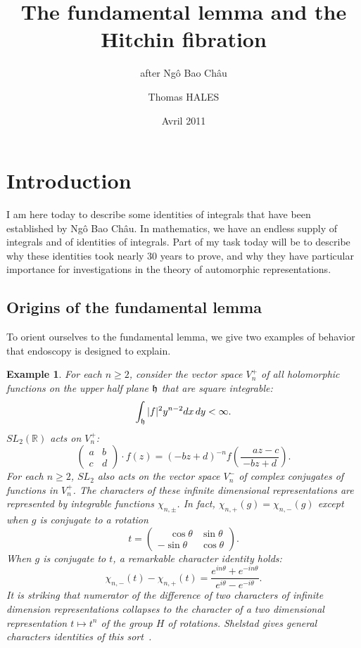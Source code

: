 \documentclass[brochure,english,12pt]{bourbaki}
\date{Avril 2011}
\title{The fundamental lemma and the Hitchin fibration}
\subtitle{after Ng\^o Bao Ch\^au}
\author{Thomas HALES}
\newtheorem{example}[equation]{Example}
\newcommand{\ring}[1]{\mathbb{#1}}
\newcommand{\NBC}{Ng\^o Bao Ch\^au}
\begin{document}
\maketitle

{


}


\section{Introduction}


I am here today to describe some identities of integrals that have
been established by \NBC.  In mathematics, we have an endless supply
of integrals and of identities of integrals.  Part of my task today
will be to describe why these identities took nearly 30 years to
prove, and why they have particular importance for investigations in
the theory of automorphic representations.






\subsection{Origins of the fundamental lemma}


To orient ourselves to the fundamental lemma, we give two examples of
behavior that endoscopy is designed to explain.


\begin{example}  For each $n\ge 2$, consider the vector space $V^+_n$
of all holomorphic functions on the upper half plane ${\frak h}$ that
are square integrable:
\[
\int_{\frak h} |f|^2 y^{n-2} dx\, dy < \infty.
\]
$SL_2(\ring{R})$ acts on $V^+_n$:
\[
\begin{pmatrix} a & b \\ c & d \end{pmatrix} \cdot f(z) = 
(-b z + d ) ^{-n} f (\frac{\phantom{-}a z - c}{-b z + d}).
\]
For each $n\ge 2$, $SL_2$ also acts on the vector space $V^-_n$ of complex
conjugates of functions in $V^+_n$.
The characters of these infinite dimensional representations are represented by integrable functions
$\chi_{n,\pm}$.  In fact, $\chi_{n,+}(g)=\chi_{n,-}(g)$ except when $g$ is conjugate to a rotation
\[
t = \begin{pmatrix} \phantom{-}\cos\theta & \sin\theta \\ -\sin\theta & \cos\theta\end{pmatrix}.
\] 
When $g$ is conjugate to $t$, a remarkable character identity holds:
\[
\chi_{n,-}(t) - \chi_{n,+}(t) = 
\frac{e^{i n \theta} + e^{- i n \theta}}{e^{i\theta}-e^{-i\theta}}.
\]
It is striking that numerator of the difference of two characters of
infinite dimension representations collapses to the character of a two
dimensional representation $t\mapsto t^n$ of the group $H$ of
rotations.  Shelstad gives general characters identities of this
sort~\cite{Sh}.
\end{example}
\end{document}
